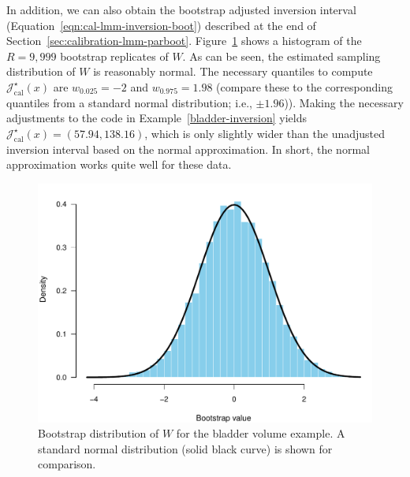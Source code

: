\documentclass[cmfont,usenames,dvipsnames,leqno]{afit-etd}\usepackage[]{graphicx}\usepackage[]{color}
\makeatletter
\def\maxwidth{ %
  \ifdim\Gin@nat@width>\linewidth
    \linewidth
  \else
    \Gin@nat@width
  \fi
}
\newenvironment{knitrout}{}{} %
\renewenvironment{knitrout}{\begin{singlespace}}{\end{singlespace}}
\newcommand{\boot}{\star} %
\newcommand{\mc}[1]{\ensuremath{\mathcal{#1}}}
\makeatother
\begin{document}
In addition, we can also obtain the bootstrap adjusted inversion interval (Equation~\eqref{eqn:cal-lmm-inversion-boot}) described at the end of Section~\ref{sec:calibration-lmm-parboot}.
Figure~\ref{fig:bladder-parboot-hist1} shows a histogram of the $R = 9,999$ bootstrap replicates of $W$. As can be seen, the estimated sampling distribution of $W$ is reasonably normal. The necessary quantiles to compute $\mc{J}_\mathrm{cal}^\boot(x)$ are $w_{0.025} = -2$ and $w_{0.975} = 1.98$ (compare these to the corresponding quantiles from a standard normal distribution; i.e., $\pm 1.96$)). Making the necessary adjustments to the code in Example~\ref{bladder-inversion} yields $\mc{J}_\mathrm{cal}^\boot(x) = (57.94, 138.16)$, which is only slightly wider than the unadjusted inversion interval based on the normal approximation. In short, the normal approximation works quite well for these data.

\begin{knitrout}
\color{fgcolor}\begin{figure}[H]

\includegraphics[width=\maxwidth]{figure/bladder-parboot-hist1} \caption[Bootstrap distribution of $W$ for the bladder volume example]{Bootstrap distribution of $W$ for the bladder volume example. A standard normal distribution (solid black curve) is shown for comparison.\label{fig:bladder-parboot-hist1}}
\end{figure}


\end{knitrout}
\end{document}
